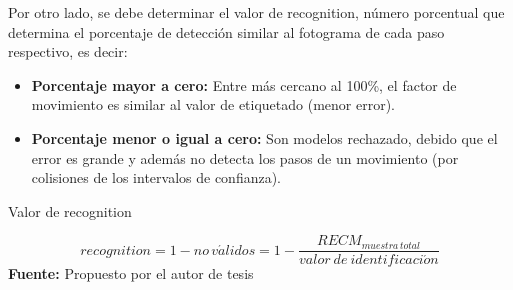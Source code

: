 Por otro lado, se debe determinar el valor de recognition, n\'umero porcentual que determina el porcentaje de detecci\'on similar al fotograma de cada paso respectivo, es decir:
 \begin{itemize}
\item \textbf{Porcentaje mayor a cero:} Entre m\'as cercano al 100\%, el factor de movimiento es similar al valor de etiquetado (menor error).
\item \textbf{Porcentaje menor o igual a cero:} Son modelos rechazado, debido que el error es grande y adem\'as no detecta los pasos de un movimiento (por colisiones de los intervalos de confianza).
\end{itemize}
\begin{formula}[H]
	\centering
	\caption{Valor de recognition}
	\label{frm:Recognitiona}
	\begin{equation}
recognition=1-no\,v\acute{a}lidos=1-\frac{RECM_{muestra\, total}}{valor\: de\: identificaci\acute{o}n}  
	\end{equation}
	\textbf{Fuente:} Propuesto por el autor de tesis
\end{formula}
